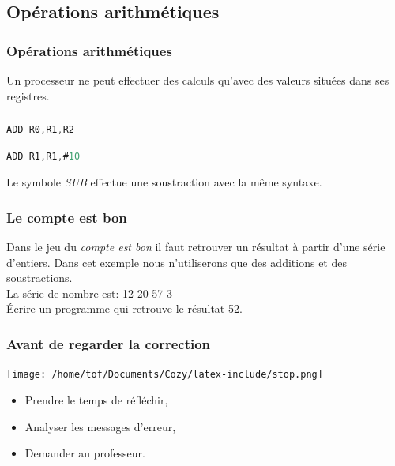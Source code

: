 \documentclass[svgnames,11pt]{beamer}
\begin{document}
\subsection{Opérations arithmétiques}
\begin{frame}
    \frametitle{Opérations arithmétiques}

    \begin{aretenir}[]
        Un processeur ne peut effectuer des calculs qu'avec des valeurs situées dans ses registres.
    \end{aretenir}

\end{frame}
\begin{frame}[fragile]
    \frametitle{}

    \begin{center}
        \begin{lstlisting}[language=C , basicstyle=\small, xleftmargin=2em, xrightmargin=2em]
ADD R0,R1,R2
\end{lstlisting}
        \label{CODE}
    \end{center}
    \begin{center}
        \begin{lstlisting}[language=C , basicstyle=\small, xleftmargin=2em, xrightmargin=2em]
ADD R1,R1,#10
\end{lstlisting}
        \label{CODE}
    \end{center}
    Le symbole \emph{SUB} effectue une soustraction avec la même syntaxe.
\end{frame}
\begin{frame}
    \frametitle{Le compte est bon}

    \begin{activite}
        Dans le jeu du \emph{compte est bon} il faut retrouver un résultat à partir d'une série d'entiers. Dans cet exemple nous n'utiliserons que des additions et des soustractions.\\ La série de nombre est: 12 20 57 3
        \\
        Écrire un programme qui retrouve le résultat 52.
    \end{activite}

\end{frame}
\begin{frame}
    \frametitle{Avant de regarder la correction}
\begin{center}
    \centering
    \texttt{[image: /home/tof/Documents/Cozy/latex-include/stop.png]}
    \end{center}
{\Large
    \begin{itemize}
        \item Prendre le temps de réfléchir,
        \item Analyser les messages d'erreur,
        \item Demander au professeur.
    \end{itemize}
}
\end{frame}
\end{document}
